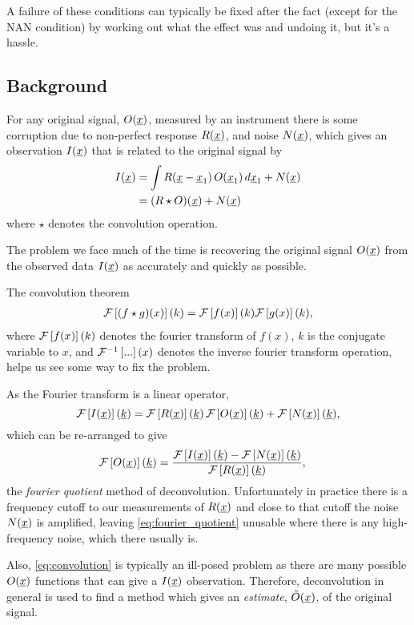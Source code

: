 A failure of these conditions can typically be fixed after the fact (except for the NAN condition) by working out what the effect was and undoing it, but it's a hassle.

\subsection{Background}

For any original signal, $O(\underline{x})$, measured by an instrument there is some corruption due to non-perfect response $R(\underline{x})$, and noise $N(\underline{x})$, which gives an observation $I(\underline{x})$ that is related to the original signal by
\begin{align}
	I(\underline{x}) 	&= \int {R(\ensuremath{\underline{x}}-\ensuremath{\underline{x}}_1) \, O(\ensuremath{\underline{x}}_1)} \, d\underline{x}_1 + N(\underline{x}) \nonumber \\
			&= (R \star O)(\underline{x}) + N(\underline{x})
	\label{eq:convolution}
\end{align}
where $\star$ denotes the convolution operation.

The problem we face much of the time is recovering the original signal $O(\underline{x})$ from the observed data $I(\underline{x})$ as accurately and quickly as possible.

The convolution theorem
\begin{align}
	\mathcal{F}\left[ (f \star g)(x) \right](k) = \mathcal{F}\left[ f(x) \right](k) \mathcal{F}\left[ g(x) \right](k),
	\label{eq:conv_theorem}
\end{align}
where $\mathcal{F}\left[ f(x) \right](k)$ denotes the fourier transform of $f(x)$, $k$ is the conjugate variable to $x$, and $\mathcal{F}^{-1}\left[ ... \right](x)$ denotes the inverse fourier transform operation, helps us see some way to fix the problem.

As the Fourier transform is a linear operator,
\[
	\mathcal{F}\left[ I(\underline{x}) \right](\underline{k}) = \mathcal{F}\left[ R(\underline{x}) \right](\underline{k}) \, \mathcal{F}\left[ O(\underline{x}) \right](\underline{k}) 
							+ \mathcal{F}\left[ N(\underline{x}) \right](\underline{k}),
\]
which can be re-arranged to give
\begin{align}
	\mathcal{F}\left[ O(\underline{x}) \right](\underline{k}) &= \frac{\mathcal{F}\left[ I(\underline{x}) \right](\underline{k}) - \mathcal{F}\left[ N(\underline{x}) \right](\underline{k})}
						{\mathcal{F}\left[ R(\underline{x}) \right](\underline{k})},
	\label{eq:fourier_quotient}
\end{align}
the \emph{fourier quotient} method of deconvolution. Unfortunately in practice there is a frequency cutoff to our measurements of $R(\underline{x})$ and close to that cutoff the noise $N(\underline{x})$ is amplified, leaving \eqref{eq:fourier_quotient} unusable where there is any high-frequency noise, which there usually is.

Also, \eqref{eq:convolution} is typically an ill-posed problem as there are many possible $O(\underline{x})$ functions that can give a $I(\underline{x})$ observation. Therefore, deconvolution in general is used to find a method which gives an \emph{estimate}, $\tilde{O}(\underline{x})$, of the original signal.


